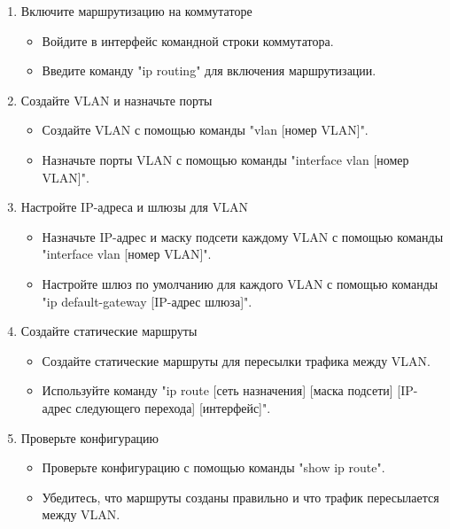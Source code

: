 \begin{enumerate}
    \item Включите маршрутизацию на коммутаторе
    \begin{itemize}
        \item Войдите в интерфейс командной строки коммутатора.
        \item Введите команду "ip routing" для включения маршрутизации.
    \end{itemize}

    \item Создайте VLAN и назначьте порты
    \begin{itemize}
        \item Создайте VLAN с помощью команды "vlan [номер VLAN]".
        \item Назначьте порты VLAN с помощью команды "interface vlan
        [номер VLAN]".
    \end{itemize}

    \item Настройте IP-адреса и шлюзы для VLAN
    \begin{itemize}
        \item Назначьте IP-адрес и маску подсети каждому VLAN с помощью
        команды "interface vlan [номер VLAN]".
        \item Настройте шлюз по умолчанию для каждого VLAN с помощью
        команды "ip default-gateway [IP-адрес шлюза]".
    \end{itemize}

    \item Создайте статические маршруты
    \begin{itemize}
        \item Создайте статические маршруты для пересылки трафика между
        VLAN.
        \item Используйте команду "ip route [сеть назначения] [маска подсети]
        [IP-адрес следующего перехода] [интерфейс]".
    \end{itemize}

    \item Проверьте конфигурацию
    \begin{itemize}
        \item Проверьте конфигурацию с помощью команды "show ip route".
        \item Убедитесь, что маршруты созданы правильно и что трафик
        пересылается между VLAN.
    \end{itemize}
\end{enumerate}

